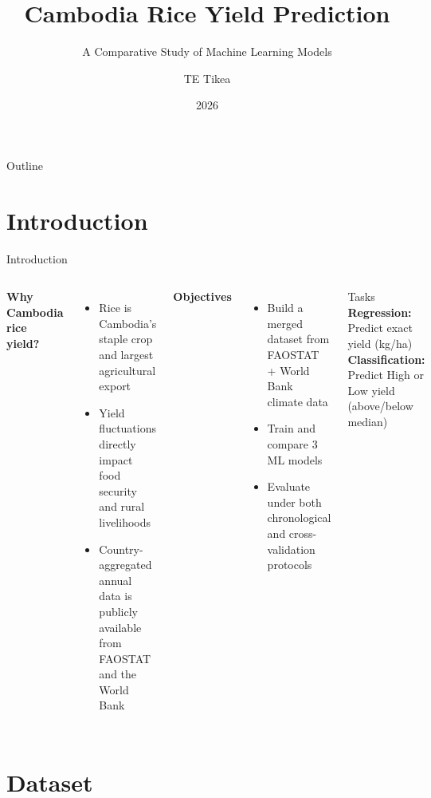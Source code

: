 \documentclass[aspectratio=169]{beamer}
\title{Cambodia Rice Yield Prediction}
\subtitle{A Comparative Study of Machine Learning Models}
\author{TE Tikea}
\institute{Robotic Pathway \\ECAM LaSalle / ITC}
\date{2026}
\begin{document}
\begin{frame}
  \titlepage
\end{frame}

\begin{frame}{Outline}
  \tableofcontents
\end{frame}

\section{Introduction}

\begin{frame}{Introduction}
  \begin{columns}
      \textbf{Why Cambodia rice yield?}
      \begin{itemize}
        \item Rice is Cambodia's staple crop and largest agricultural export
        \item Yield fluctuations directly impact food security and rural livelihoods
        \item Country-aggregated annual data is publicly available from FAOSTAT and the World Bank
      \end{itemize}
      \vspace{0.5em}
      \textbf{Objectives}
      \begin{itemize}
        \item Build a merged dataset from FAOSTAT + World Bank climate data
        \item Train and compare 3 ML models
        \item Evaluate under both chronological and cross-validation protocols
      \end{itemize}
      \begin{block}{Tasks}
        \textbf{Regression:} Predict exact yield (kg/ha)\\[0.5em]
        \textbf{Classification:} Predict High or Low yield (above/below median)
      \end{block}
  \end{columns}
\end{frame}

\section{Dataset}
\end{document}
